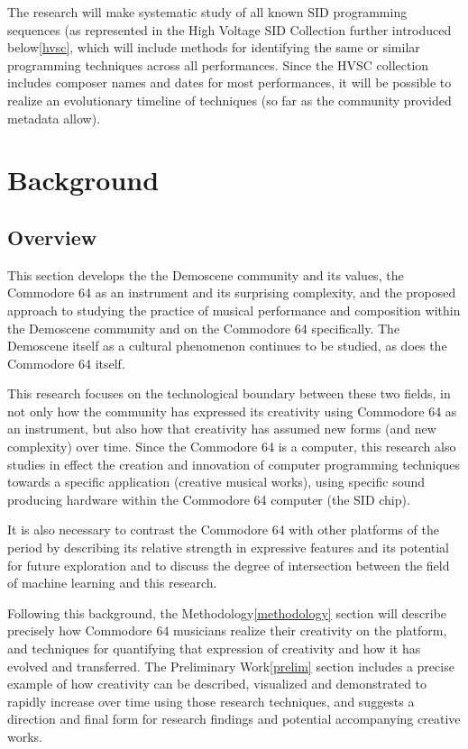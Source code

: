 \documentclass[10pt]{article}
\begin{document}
\begin{multicols*}{2}
The research will make systematic study of all known SID programming sequences (as represented in the High Voltage SID Collection\cite{hvsc} further introduced below\ref{hvsc}, which will include methods for identifying the same or similar programming techniques across all performances. Since the HVSC collection includes composer names and dates for most performances, it will be possible to realize an evolutionary timeline of techniques (so far as the community provided metadata allow).

  \section{Background}

  \subsection{Overview}

This section develops the  the Demoscene community and its values, the Commodore 64 as an instrument and its surprising complexity, and the proposed approach to studying the practice of musical performance and composition within the Demoscene community and on the Commodore 64 specifically. The Demoscene itself as a cultural phenomenon continues to be studied, as does the Commodore 64 itself.

This research focuses on the technological boundary between these two fields, in not only how the community has expressed its creativity using Commodore 64 as an instrument, but also how that creativity has assumed new forms (and new complexity) over time. Since the Commodore 64 is a computer, this research also studies in effect the creation and innovation of computer programming techniques towards a specific application (creative musical works), using specific sound producing hardware within the Commodore 64 computer (the SID chip).

It is also necessary to contrast the Commodore 64 with other platforms of the period by describing its relative strength in expressive features and its potential for future exploration and to discuss the degree of intersection between the field of machine learning and this research.

Following this background, the Methodology\ref{methodology} section will describe precisely how Commodore 64 musicians realize their creativity on the platform, and techniques for quantifying that expression of creativity and how it has evolved and transferred. The Preliminary Work\ref{prelim} section includes a precise example of how creativity can be described, visualized and demonstrated to rapidly increase over time using those research techniques, and suggests a direction and final form for research findings and potential accompanying creative works.


\end{multicols*}
\end{document}
